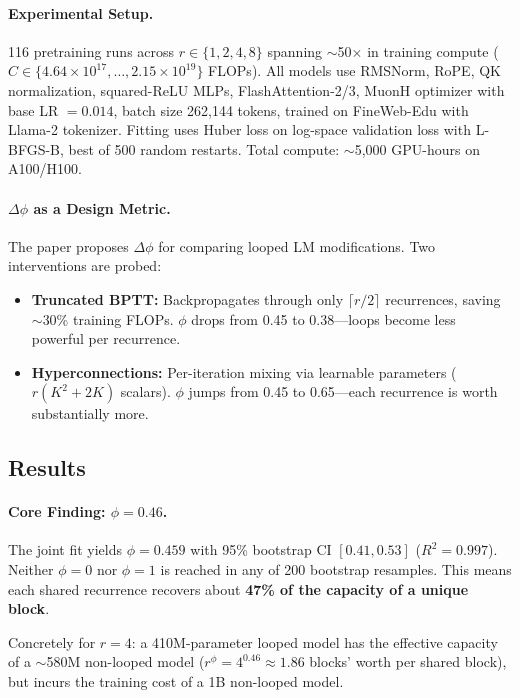 \documentclass[11pt]{article}
\begin{document}
\paragraph{Experimental Setup.}
116 pretraining runs across $r \in \{1, 2, 4, 8\}$ spanning $\sim$50$\times$ in training compute ($C \in \{4.64 \times 10^{17}, \ldots, 2.15 \times 10^{19}\}$ FLOPs). All models use RMSNorm, RoPE, QK normalization, squared-ReLU MLPs, FlashAttention-2/3, MuonH optimizer with base LR $= 0.014$, batch size 262,144 tokens, trained on FineWeb-Edu with Llama-2 tokenizer. Fitting uses Huber loss on log-space validation loss with L-BFGS-B, best of 500 random restarts. Total compute: $\sim$5,000 GPU-hours on A100/H100.

\paragraph{$\Delta\phi$ as a Design Metric.}
The paper proposes $\Delta\phi$ for comparing looped LM modifications. Two interventions are probed:
\begin{itemize}
    \item \textbf{Truncated BPTT:} Backpropagates through only $\lceil r/2 \rceil$ recurrences, saving $\sim$30\% training FLOPs. $\phi$ drops from 0.45 to 0.38---loops become less powerful per recurrence.
    \item \textbf{Hyperconnections:} Per-iteration mixing via learnable parameters ($r(K^2 + 2K)$ scalars). $\phi$ jumps from 0.45 to 0.65---each recurrence is worth substantially more.
\end{itemize}

\subsection{Results}

\paragraph{Core Finding: $\phi = 0.46$.}
The joint fit yields $\phi = 0.459$ with 95\% bootstrap CI $[0.41, 0.53]$ ($R^2 = 0.997$). Neither $\phi = 0$ nor $\phi = 1$ is reached in any of 200 bootstrap resamples. This means each shared recurrence recovers about \textbf{47\% of the capacity of a unique block}.

Concretely for $r{=}4$: a 410M-parameter looped model has the effective capacity of a $\sim$580M non-looped model ($r^{\phi} = 4^{0.46} \approx 1.86$ blocks' worth per shared block), but incurs the training cost of a 1B non-looped model.
\end{document}

